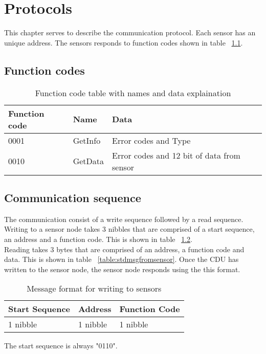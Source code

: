 \chapter{Protocols}
This chapter serves to describe the communication protocol. Each sensor has an unique address. The sensors responds to function codes shown in table ~\ref{table:functioncodes}.

\section{Function codes}
\begin{table}[H]
\centering
\begin{tabular}{|l|l|l|}
	\hline
	Function code & Name & Data \\ 
	\hline
	0001 	& GetInfo & Error codes and Type \\
	\hline
	0010	& GetData & Error codes and 12 bit of data from sensor \\
	\hline
\end{tabular}
\caption{Function code table with names and data explaination}
\label{table:functioncodes}
\end{table}

\section{Communication sequence}
The communication consist of a write sequence followed by a read sequence.\\
Writing to a sensor node takes 3 nibbles that are comprised of a start sequence, an address and a function code. This is shown in table ~\ref{table:stdmsgtosensor}.\\ 
Reading takes 3 bytes that are comprised of an address, a function code and data. This is shown in table ~\ref{table:stdmsgfromsensor}. Once the CDU has written to the sensor node, the sensor node responds using the this format. \\

\begin{table}[H]
\centering
\begin{tabular}{|l|l|l|}
	\hline
	Start Sequence & Address & Function Code \\ \hline
	1 nibble & 1 nibble	& 1 nibble \\
	\hline
\end{tabular}
\caption{Message format for writing to sensors}
\label{table:stdmsgtosensor}
\end{table}
The start sequence is always "0110".\\


